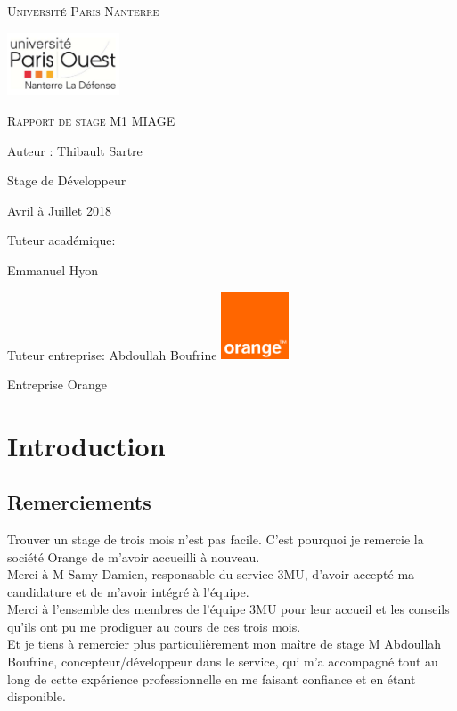 \documentclass[a4paper,twoside,12pt]{report}
\begin{document}
\begin{titlepage}
	\centering
	\vspace{1cm}
	{\scshape\large Université Paris Nanterre \par}
	\vspace{1cm}
	\includegraphics[width=0.25\textwidth]{univ.JPG}\par
	\vfill
	{\scshape\Huge Rapport de stage M1 MIAGE\par}
	\vspace{1cm}
	{\LARGE Auteur : Thibault Sartre\par}
	\vspace{1cm}
	{\Large Stage de Développeur\par}
	\vspace{1cm}
	{\large Avril à Juillet 2018\par}
	\vspace{1cm}
	\vfill
	{\large Tuteur académique:}
	{\large Emmanuel Hyon\par}
	\vspace{0.5cm}
	{\large Tuteur entreprise:}
	{\large Abdoullah Boufrine}
	\vfill
	\vfill
	\vfill
	\includegraphics[width=0.15\textwidth]{orange.png}\par
	\vspace{1cm}
	{\large Entreprise Orange\par}


\end{titlepage}
\renewcommand{\contentsname}{Sommaire}
\tableofcontents{}
\newpage
\chapter{Introduction}
\section{Remerciements}
Trouver un stage de trois mois n'est pas facile. C'est pourquoi je remercie la société Orange de m'avoir accueilli à nouveau.\\
Merci à M Samy Damien, responsable du service 3MU, d'avoir accepté ma candidature et de m'avoir intégré à l'équipe.\\
Merci à l'ensemble des membres de l'équipe 3MU pour leur accueil et les conseils qu'ils ont pu me prodiguer au cours de ces trois mois.\\
Et je tiens à remercier plus particulièrement mon maître de stage M Abdoullah Boufrine, concepteur/développeur dans le service, qui m'a accompagné tout au long de cette expérience professionnelle en me faisant confiance et en étant disponible.\\
\end{document}
